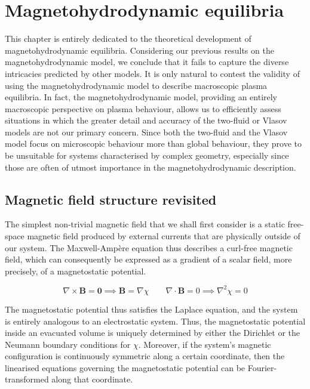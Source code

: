 \chapter{Magnetohydrodynamic equilibria}

\label{mhd-equilibria}

This chapter is entirely dedicated to the theoretical development of magnetohydrodynamic equilibria. Considering our previous results on the magnetohydrodynamic model, we conclude that it fails to capture the diverse intricacies predicted by other models. It is only natural to contest the validity of using the magnetohydrodynamic model to describe macroscopic plasma equilibria. In fact, the magnetohydrodynamic model, providing an entirely macroscopic perspective on plasma behaviour, allows us to efficiently assess situations in which the greater detail and accuracy of the two-fluid or Vlasov models are not our primary concern. Since both the two-fluid and the Vlasov model focus on microscopic behaviour more than global behaviour, they prove to be unsuitable for systems characterised by complex geometry, especially since those are often of utmost importance in the magnetohydrodynamic description.

\section{Magnetic field structure revisited}

The simplest non-trivial magnetic field that we shall first consider is a static free-space magnetic field produced by external currents that are physically outside of our system. The Maxwell-Ampère equation thus describes a curl-free magnetic field, which can consequently be expressed as a gradient of a scalar field, more precisely, of a magnetostatic potential.

\begin{equation}
    \nabla\times\mathbf{B}=\mathbf{0}\implies\mathbf{B}=\nabla\chi\qquad\nabla\cdot\mathbf{B}=0\implies\nabla^2\chi=0
\end{equation}

The magnetostatic potential thus satisfies the Laplace equation, and the system is entirely analogous to an electrostatic system. Thus, the magnetostatic potential inside an evacuated volume is uniquely determined by either the Dirichlet or the Neumann boundary conditions for $\chi$. Moreover, if the system's magnetic configuration is continuously symmetric along a certain coordinate, then the linearised equations governing the magnetostatic potential can be Fourier-transformed along that coordinate.

